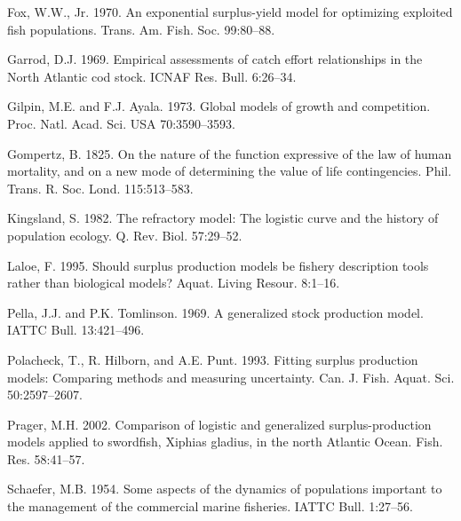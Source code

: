 \documentclass[fleqn]{article}
\begin{document}
\small\sloppy\frenchspacing\setlength{\hyphenpenalty}{1000}
\begin{description}
  \item Fox, W.W., Jr. 1970. An exponential surplus-yield model for optimizing
  exploited fish populations. Trans. Am. Fish. Soc. 99:80--88.

  \item Garrod, D.J. 1969. Empirical assessments of catch effort relationships
  in the North Atlantic cod stock. ICNAF Res. Bull. 6:26--34.

  \item Gilpin, M.E. and F.J. Ayala. 1973. Global models of growth and
  competition. Proc. Natl. Acad. Sci. USA 70:3590--3593.

  \item Gompertz, B. 1825. On the nature of the function expressive of the law
  of human mortality, and on a new mode of determining the value of life
  contingencies. Phil. Trans. R. Soc. Lond. 115:513--583.

  \item Kingsland, S. 1982. The refractory model: The logistic curve and the
  history of population ecology. Q. Rev. Biol. 57:29--52.

  \item Laloe, F. 1995. Should surplus production models be fishery description
  tools rather than biological models? Aquat. Living Resour. 8:1--16.

  \item Pella, J.J. and P.K. Tomlinson. 1969. A generalized stock production
  model. IATTC Bull. 13:421--496.

  \item Polacheck, T., R. Hilborn, and A.E. Punt. 1993. Fitting surplus
  production models: Comparing methods and measuring uncertainty. Can. J. Fish.
  Aquat. Sci. 50:2597--2607.

  \item Prager, M.H. 2002. Comparison of logistic and generalized
  surplus-production models applied to swordfish, Xiphias gladius, in the north
  Atlantic Ocean. Fish. Res. 58:41--57.

  \item Schaefer, M.B. 1954. Some aspects of the dynamics of populations
  important to the management of the commercial marine fisheries. IATTC Bull.
  1:27--56.
\end{description}
\end{document}
